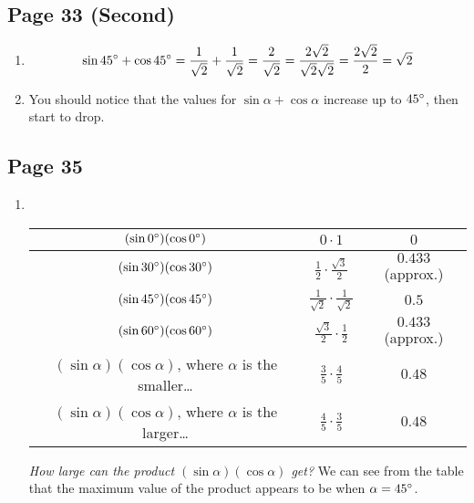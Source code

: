 \documentclass{article}
\newenvironment{solutions}[1]
{\subsection*{#1}
 \begin{enumerate}[leftmargin=1.5em]}
{\end{enumerate}}
\newcommand{\solution}{\item}
\begin{document}
\begin{solutions}{Page 33 (Second)}
\solution %
\begin{equation*}
\sin{45\degree} + \cos{45\degree} = \frac{1}{\sqrt{2}} + \frac{1}{\sqrt{2}} = \frac{2}{\sqrt{2}} = \frac{2\sqrt{2}}{\sqrt{2}\sqrt{2}} = \frac{2\sqrt{2}}{2} = \sqrt{2}
\end{equation*}

\solution %
You should notice that the values for $\sin{\alpha} + \cos{\alpha}$ increase up to $45\degree$, then start to drop.

\end{solutions}

\begin{solutions}{Page 35}
\solution ~
\begin{center}
\bgroup
\def\arraystretch{2}
\setlength\tabcolsep{15pt}
\begin{tabular}{ |c|c|c| }
\hline
$(\sin{0\degree})(\cos{0\degree})$   & $0\cdot1$        & $0$ \\
\hline
$(\sin{30\degree})(\cos{30\degree})$ & $\frac{1}{2}\cdot\frac{\sqrt{3}}{2}$ & $0.433$ (approx.) \\
\hline
$(\sin{45\degree})(\cos{45\degree})$ & $\frac{1}{\sqrt{2}}\cdot\frac{1}{\sqrt{2}}$ & $0.5$ \\
\hline
$(\sin{60\degree})(\cos{60\degree})$ & $\frac{\sqrt{3}}{2}\cdot\frac{1}{2}$ & $0.433$ (approx.) \\
\hline
\makecell{$(\sin{\alpha})(\cos{\alpha})$, where $\alpha$\\ is the smaller\ldots}  & $\frac{3}{5}\cdot\frac{4}{5}$ & $0.48$ \\
\hline
\makecell{$(\sin{\alpha})(\cos{\alpha})$, where $\alpha$\\ is the larger\ldots}  & $\frac{4}{5}\cdot\frac{3}{5}$ & $0.48$ \\
\hline
\end{tabular}
\egroup
\end{center}
\textit{How large can the product $(\sin{\alpha})(\cos{\alpha})$ get?}
We can see from the table that the maximum value of the product appears to be when $\alpha = 45\degree$.
\end{solutions}
\end{document}
